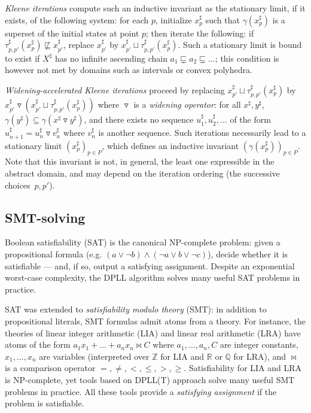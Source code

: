 \documentclass[preprint]{sigplanconf}
\newcommand{\abstr}[1]{#1^\sharp}
\newcommand{\ZZ}{\mathbb{Z}}
\newcommand{\QQ}{\mathbb{Q}}
\newcommand{\RR}{\mathbb{R}}
\newcommand{\widening}{\mathop{\triangledown}}
\begin{document}
\emph{Kleene iterations} compute such an inductive invariant as the stationary limit, if it exists, of the following system: for each $p$, initialize $\abstr{x}_p$ such that $\gamma(\abstr{x}_p)$ is a superset of the initial states at point $p$; then iterate the following:
if $\abstr{\tau}_{p,p'} (\abstr{x}_p) \nsqsubseteq \abstr{x}_{p'}$, replace $\abstr{x}_{p'}$ by $\abstr{x}_{p'} \sqcup \abstr{\tau}_{p,p'} (\abstr{x}_p)$.
Such a stationary limit is bound to exist if $\abstr{X}$ has no infinite ascending chain $a_1 \sqsubsetneq a_2 \sqsubsetneq \dots$; this condition is however not met by domains such as intervals or convex polyhedra.

\emph{Widening-accelerated Kleene iterations} proceed by replacing $\abstr{x}_{p'} \sqcup \abstr{\tau}_{p,p'} (\abstr{x}_p)$ by $\abstr{x}_{p'} \widening (\abstr{x}_{p'} \sqcup \abstr{\tau}_{p,p'} (\abstr{x}_p))$ where $\widening$ is a \emph{widening operator}: for all $\abstr{x},\abstr{y}$, $\gamma(\abstr{y}) \subseteq \gamma(\abstr{x} \widening \abstr{y})$, and there exists no sequence $\abstr{u}_1,\abstr{u}_2,\dots$ of the form $\abstr{u}_{n+1} = \abstr{u}_n \widening \abstr{v}_n$ where $\abstr{v}_n$ is another sequence.
Such iterations necessarily lead to a stationary limit $(\abstr{x}_p)_{p \in P}$, which defines an inductive invariant $(\gamma(\abstr{x}_p))_{p \in P}$. Note that this invariant is not, in general, the least one expressible in the abstract domain, and may depend on the iteration ordering (the successive choices~$p,p'$).

\subsection{SMT-solving}
Boolean satisfiability (SAT) is the canonical NP-complete problem: given a propositional formula (e.g. $(a \lor \neg b) \land (\neg a \lor b \lor \neg c)$), decide whether it is satisfiable --- and, if so, output a satisfying assignment.
Despite an exponential worst-case complexity, the DPLL algorithm \cite{Kroening_Strichman_08,Handbook_SAT} solves many useful SAT problems in practice.

SAT was extended to \emph{satisfiability modulo theory} (SMT): in addition to propositional literals, SMT formulas admit atoms from a theory.
For instance, the theories of linear integer arithmetic (LIA) and linear real arithmetic (LRA) have atoms of the form $a_1 x_1 + \dots + a_n x_n \bowtie C$ where $a_1,\dots,a_n,C$ are integer constants, $x_1,\dots,x_n$ are variables (interpreted over $\ZZ$ for LIA and $\RR$ or $\QQ$ for LRA), and $\bowtie$ is a comparison operator $=,\neq,<,\leq,>,\geq$.
Satisfiability for LIA and LRA is NP-complete, yet tools based on DPLL(T) approach \cite{Kroening_Strichman_08,Handbook_SAT} solve many useful SMT problems in practice. All these tools provide a \emph{satisfying assignment} if the problem is satisfiable.
\end{document}
